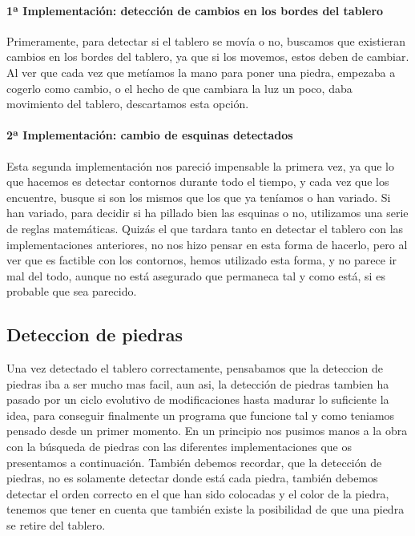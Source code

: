 \documentclass[12pt,a4paper]{report}
\begin{document}
\paragraph{1ª Implementación: detección de cambios en los bordes del tablero}
Primeramente, para detectar si el tablero se movía o no, buscamos que existieran
cambios en los bordes del tablero, ya que si los movemos, estos deben de
cambiar. Al ver que cada vez que metíamos la mano para poner una piedra,
empezaba a cogerlo como cambio, o el hecho de que cambiara la luz un poco, daba
movimiento del tablero, descartamos esta opción. 

\paragraph{2ª Implementación: cambio de esquinas detectados} 
Esta segunda implementación nos pareció impensable la primera vez, ya que lo que
hacemos es detectar contornos durante todo el tiempo, y cada vez que los
encuentre, busque si son los mismos que los que ya teníamos o han variado. Si
han variado, para decidir si ha pillado bien las esquinas o no, utilizamos una
serie de reglas matemáticas. 
Quizás el que tardara tanto en detectar el tablero con las implementaciones
anteriores, no nos hizo pensar en esta forma de hacerlo, pero al ver que es
factible con los contornos, hemos utilizado esta forma, y no parece ir mal del
todo, aunque no está asegurado que permaneca tal y como está, si es probable que
sea parecido. 


\subsection{Deteccion de piedras} 
Una vez detectado el tablero correctamente,
pensabamos que la deteccion de piedras iba a ser mucho mas facil, aun asi, la
detección de piedras tambien ha pasado por un ciclo evolutivo de modificaciones
hasta madurar lo suficiente la idea, para conseguir finalmente un programa que
funcione tal y como teniamos pensado desde un primer momento. En un principio
nos pusimos manos a la obra con la búsqueda de piedras con las diferentes
implementaciones que os presentamos a continuación.
También debemos recordar, que la detección de
piedras, no es solamente detectar donde está cada piedra, también debemos
detectar el orden correcto en el que han sido colocadas y el color de la piedra,
tenemos que tener en cuenta que también existe la posibilidad de que una piedra
se retire del tablero. 
\end{document}
